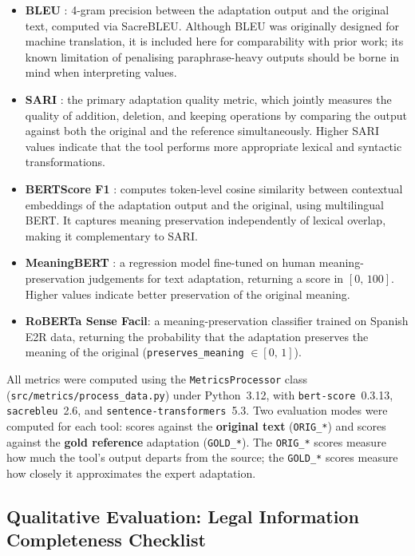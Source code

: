 \documentclass[12pt, a4paper]{article}
\begin{document}
\begin{itemize}
  \item \textbf{BLEU} \citep{Papineni2002}: 4-gram precision between the adaptation output
    and the original text, computed via SacreBLEU. Although BLEU was originally designed
    for machine translation, it is included here for comparability with prior work; its
    known limitation of penalising paraphrase-heavy outputs should be borne in mind when
    interpreting values.
  \item \textbf{SARI} \citep{Xu2016}: the primary adaptation quality metric, which jointly
    measures the quality of addition, deletion, and keeping operations by comparing the
    output against both the original and the reference simultaneously. Higher SARI values
    indicate that the tool performs more appropriate lexical and syntactic transformations.
  \item \textbf{BERTScore F1} \citep{Zhang2020}: computes token-level cosine similarity
    between contextual embeddings of the adaptation output and the original, using
    multilingual BERT. It captures meaning preservation independently of lexical overlap,
    making it complementary to SARI.
  \item \textbf{MeaningBERT} \citep{Devaraj2021}: a regression model fine-tuned on human
    meaning-preservation judgements for text adaptation, returning a score in
    $[0,\,100]$. Higher values indicate better preservation of the original meaning.
  \item \textbf{RoBERTa Sense Facil}: a meaning-preservation classifier trained on Spanish
    E2R data, returning the probability that the adaptation preserves the meaning of the
    original (\texttt{preserves\_meaning} $\in [0,\,1]$).
\end{itemize}

All metrics were computed using the \texttt{MetricsProcessor} class
(\texttt{src/metrics/process\_data.py}) under Python~3.12, with
\texttt{bert-score}~0.3.13, \texttt{sacrebleu}~2.6, and
\texttt{sentence-transformers}~5.3. Two evaluation modes were computed for each tool:
scores against the \textbf{original text} (\texttt{ORIG\_*}) and scores against the
\textbf{gold reference} adaptation (\texttt{GOLD\_*}). The \texttt{ORIG\_*} scores
measure how much the tool's output departs from the source; the \texttt{GOLD\_*} scores
measure how closely it approximates the expert adaptation.

\subsection{Qualitative Evaluation: Legal Information Completeness Checklist}
\label{ssec:checklist}
\end{document}
